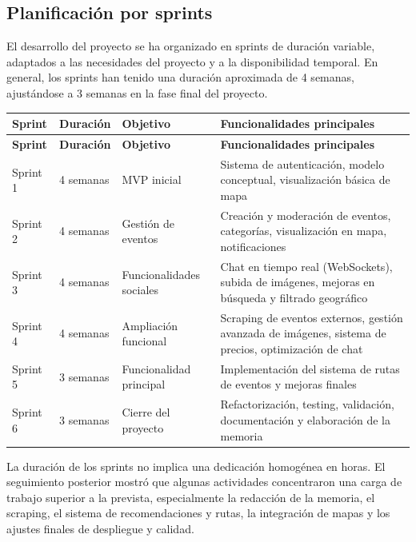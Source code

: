\subsection{Planificación por sprints}

El desarrollo del proyecto se ha organizado en sprints de duración variable, adaptados a las necesidades del proyecto y a la disponibilidad temporal. En general, los sprints han tenido una duración aproximada de 4 semanas, ajustándose a 3 semanas en la fase final del proyecto.

\begin{longtable}{|p{2cm}|p{3cm}|p{4cm}|p{7cm}|}
\hline
\textbf{Sprint} & \textbf{Duración} & \textbf{Objetivo} & \textbf{Funcionalidades principales} \\
\hline
\endfirsthead

\hline
\textbf{Sprint} & \textbf{Duración} & \textbf{Objetivo} & \textbf{Funcionalidades principales} \\
\hline
\endhead

Sprint 1 & 4 semanas & MVP inicial & Sistema de autenticación, modelo conceptual, visualización básica de mapa \\
\hline

Sprint 2 & 4 semanas & Gestión de eventos & Creación y moderación de eventos, categorías, visualización en mapa, notificaciones \\
\hline

Sprint 3 & 4 semanas & Funcionalidades sociales & Chat en tiempo real (WebSockets), subida de imágenes, mejoras en búsqueda y filtrado geográfico \\
\hline

Sprint 4 & 4 semanas & Ampliación funcional & Scraping de eventos externos, gestión avanzada de imágenes, sistema de precios, optimización de chat \\
\hline

Sprint 5 & 3 semanas & Funcionalidad principal & Implementación del sistema de rutas de eventos y mejoras finales \\
\hline

Sprint 6 & 3 semanas & Cierre del proyecto & Refactorización, testing, validación, documentación y elaboración de la memoria \\
\hline

\end{longtable}

La duración de los sprints no implica una dedicación homogénea en horas. El seguimiento posterior mostró que algunas actividades concentraron una carga de trabajo superior a la prevista, especialmente la redacción de la memoria, el scraping, el sistema de recomendaciones y rutas, la integración de mapas y los ajustes finales de despliegue y calidad.

